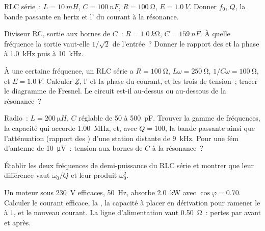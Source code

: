 \begin{exercise}[$\star$]\label{exo:b1:sinusoidal-impedance:4}
RLC série~: $L = \qty{10}{mH}$, $C = \qty{100}{nF}$, $R = \qty{100}{\ohm}$,
$E = \qty{1.0}{V}$. Donner $f_0$, $Q$, la bande passante en hertz et
l' du courant à la résonance.
\end{exercise}

\begin{exercise}[$\star\star$]\label{exo:b1:sinusoidal-impedance:5}
Diviseur RC, sortie aux bornes de $C$~: $R = \qty{1.0}{k\ohm}$, $C = \qty{159}{nF}$.
À quelle fréquence la sortie vaut-elle $1/\sqrt2$ de l'entrée~? Donner
le rapport des  et la phase à \qty{1.0}{kHz} puis à \qty{10}{kHz}.
\end{exercise}

\begin{exercise}[$\star\star$]\label{exo:b1:sinusoidal-impedance:6}
À une certaine fréquence, un RLC série a $R = \qty{100}{\ohm}$, $L\omega =
\qty{250}{\ohm}$, $1/C\omega = \qty{100}{\ohm}$, et $E = \qty{1.0}{V}$.
Calculer $\underline Z$, l' et la phase du courant, et les
trois  de tension~; tracer le diagramme de Fresnel. Le circuit
est-il au-dessus ou au-dessous de la résonance~?
\end{exercise}

\begin{exercise}[$\star\star$]\label{exo:b1:sinusoidal-impedance:7}
Radio~: $L = \qty{200}{\micro H}$, $C$ réglable de \qty{50}{} à
\qty{500}{pF}. Trouver la gamme de fréquences, la capacité qui accorde
\qty{1.00}{MHz}, et, avec $Q = 100$, la bande passante ainsi que
l'atténuation (rapport des ) d'une station distante de
\qty{9}{kHz}. Pour une fém d'antenne de \qty{10}{\micro V}~: tension aux
bornes de $C$ à la résonance~?
\end{exercise}

\begin{exercise}[$\star\star$]\label{exo:b1:sinusoidal-impedance:8}
Établir les deux fréquences de demi-puissance du RLC série et
montrer que leur différence vaut $\omega_0/Q$ et leur produit $\omega_0^2$.
\end{exercise}

\begin{exercise}[$\star\star$]\label{exo:b1:sinusoidal-impedance:9}
Un moteur sous \qty{230}{V} efficaces, \qty{50}{Hz}, absorbe
\qty{2.0}{kW} avec $\cos\varphi = 0.70$. Calculer le courant efficace,
la , la capacité à placer en dérivation pour ramener
le  à $1$, et le nouveau courant. La ligne
d'alimentation vaut \qty{0.50}{\ohm}~: pertes par  avant et
après.
\end{exercise}

